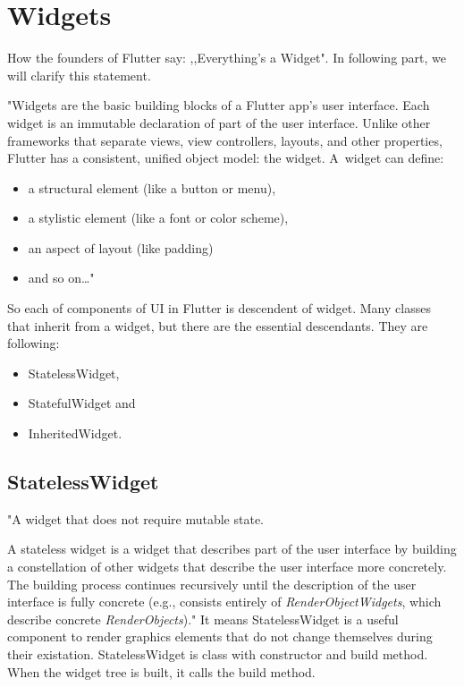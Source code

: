 \section{Widgets}\label{sec:widgets}
How the founders of Flutter say: ,,Everything's a Widget".
In following part, we will clarify this statement.

"Widgets are the basic building blocks of a Flutter app's user interface.
Each widget is an immutable declaration of part of the user interface.
Unlike other frameworks that separate views, view controllers, layouts, and other properties, Flutter has a consistent, unified object model: the widget.
A~widget can define:
\begin{itemize}
    \item a structural element (like a button or menu),
    \item a stylistic element (like a font or color scheme),
    \item an aspect of layout (like padding)
    \item and so on\ldots"\cite{flutterTechnicalOverview}
\end{itemize}

So each of components of UI in Flutter is descendent of widget.
Many classes that inherit from a widget, but there are the essential descendants.
They are following:
\begin{itemize}
    \item StatelessWidget,
    \item StatefulWidget and
    \item InheritedWidget.
\end{itemize}


\subsection{StatelessWidget}\label{subsec:statelesswidget}
"A widget that does not require mutable state.

A stateless widget is a widget that describes part of the user interface by building a constellation of other widgets that describe the user interface more concretely.
The building process continues recursively until the description of the user interface is fully concrete (e.g., consists entirely of
\textit{RenderObjectWidgets}\cite{renderObjectWidget}, which describe concrete \textit{RenderObjects}\cite{renderObject})."\cite{statelessWidget}
It means StatelessWidget is a useful component to render graphics elements that do not change themselves during their existation.
StatelessWidget is class with constructor and build method.
When the widget tree is built, it calls the build method.

